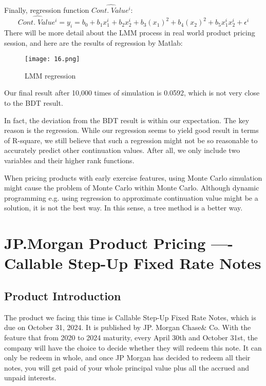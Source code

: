 \documentclass[paper = letterpaper, fontsize=12pt]{article}
\begin{document}
Finally, regression function $\hat{Cont.\;Value^i}$:
\[
\hat{Cont.\;Value^i} = y_i = b_0 + b_1x_1^i + b_2x_2^i + b_3(x_1)^2 + b_4(x_2)^2 + b_5x_1^ix_2^i + \epsilon^i
\]
There will be more detail about the LMM process in real world product pricing session, and here are the results of regression by Matlab:
\begin{figure}[H]
    \centering
    \texttt{[image: 16.png]}
    \caption{LMM regression}
\end{figure}

Our final result after 10,000 times of simulation is 0.0592, which is not very close to the BDT result.

In fact, the deviation from the BDT result is within our expectation. The key reason is the regression. While our regression seems to yield good result in terms of R-square, we still believe that such a regression might not be so reasonable to accurately predict other continuation values. After all, we only include two variables and their higher rank functions. 

When pricing products with early exercise features, using Monte Carlo simulation might cause the problem of Monte Carlo within Monte Carlo. Although dynamic programming e.g. using regression to approximate continuation value might be a solution, it is not the best way. In this sense, a tree method is a better way. 




\section{JP.Morgan Product Pricing ---- Callable Step-Up Fixed Rate Notes}

\subsection{Product Introduction}
The product we facing this time is Callable Step-Up Fixed Rate Notes, which is due on October 31, 2024. It is published by JP. Morgan Chase\& Co. With the feature that from 2020 to 2024 maturity, every April 30th and October 31st, the company will have the choice to decide whether they will redeem this note. It can only be redeem in whole, and once JP Morgan has decided to redeem all their notes, you will get paid of your whole principal value plus all the accrued and unpaid interests. 
\end{document}
